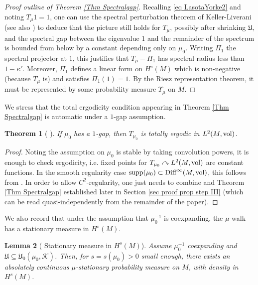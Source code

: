 \documentclass[11pt, leqno, fleqn]{amsart}
\def\cU{\mathfrak U}
\newcommand{\SectionSymbol}{\textsection}
\newcommand{\acts}{\curvearrowright}
\newcommand{\cK}{{\mathcal K}}
\newtheorem{thm}{\bf Theorem}[section]
\newtheorem{lemma}[thm]{\bf Lemma}
\theoremstyle{definition}
\theoremstyle{definition}
\def\supp{{\rm supp}}
\def \vol{  {\rm vol} }
\newcommand{\Diff}{{\rm Diff}}
\begin{document}
\begin{proof}[Proof outline of Theorem \ref{Thm Spectralgap}]
		 	Recalling \eqref{eq LasotaYorke2} and noting $T_{\mu}1=1$, one can use the spectral perturbation theorem of Keller-Liverani \cite{KL} (see also \cite[\SectionSymbol 2.7]{DD}) to deduce that the picture still holds for $T_{\mu}$, possibly after shrinking $\cU$,  and the spectral gap between the eigenvalue $1$ and the remainder of the spectrum is bounded from below by a constant depending only on $\mu_{0}$. Writing $\Pi_1$ the  spectral projector at $1$, this justifies that $T_{\mu}-\Pi_{1}$ has spectral radius less than $1-\kappa'$. Moreover, $\Pi_{1}$ defines a linear form on $H^s(M)$   which is non-negative (because $T_{\mu}$ is) and satisfies $\Pi_{1}(1)=1$.
By the Riesz representation theorem, it must be represented by some probability measure $\Upsilon_{\mu}$ on $M$.
		 \end{proof}
	
	We stress  that the total ergodicity condition appearing in  Theorem \ref{Thm Spectralgap}  is automatic under a  $1$-gap assumption. 
	
\begin{thm}[ \cite{DDZ}] \label{Thm Ergodicity0} 
If    $\mu_{0}$ has a  $1$-gap, then $T_{\mu_{0}}$ is totally ergodic in $L^2(M, \vol)$.
\end{thm}

	\begin{proof}
	Noting the assumption on $\mu_{0}$ is stable by taking convolution powers, it is enough to check ergodicity, i.e. fixed points for $T_{\mu_{0}}\acts L^2(M, \vol)$ are constant functions. In the smooth regularity case $\supp(\mu_0) \subset \Diff^{\infty}(M, \vol)$,  this follows from \cite[Thm 1.2]{DDZ}. In order to allow  $C^2$-regularity, one just needs to combine \cite[Remark 4.6]{DDZ} and    Theorem \ref{Thm Spectralgap} established later in Section \ref{sec proof prop step III}
 (which can be read quasi-independently from the remainder of the paper).
	\end{proof}
	
	We also record that under the assumption that $\mu_{0}^{-1}$ is coexpanding, the $\mu$-walk has a stationary measure in $H^s(M)$. 
		 
	\begin{lemma}[\cite{DD}  Stationary measure in $H^s(M)$] \label{Hs-stat} 		Assume  $\mu_{0}^{-1}$ coexpanding and   $\cU\subseteq \cU_{0}(\mu_{0},\cK)$. Then, for $s=s(\mu_{0})>0$ small enough,  there exists  an absolutely continuous $\mu$-stationary probability measure on $M$, with density in $H^s(M)$. 
 	\end{lemma}
\end{document}
